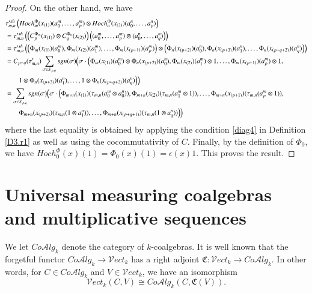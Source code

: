 \documentclass[10pt, colorlinks]{article}
\numberwithin{equation}{section} \DeclareMathSizes{2}{10}{12}{13}
\begin{document}
\begin{proof}
       
      On the other hand, we have
       \begin{align*}
&\tau'^{sh}_{m,n}\left(Hoch_m^\Phi(x_{(1)})(a_0^m,\ldots, a_p^m)\otimes Hoch_n^\Phi(x_{(2)})(a_0^n,\ldots, a_p^n)\right)\\
           &=\tau'^{sh}_{m,n}\left(\left(C^{\Phi_{m}}_{p}(x_{(1)})\otimes C^{\Phi_{n}}_{q}(x_{(2)})\right)\left((a_0^m,\ldots, a_p^m)\otimes (a^n_0,\ldots, a_q^n)\right)\right)\\
           &=\tau'^{sh}_{m,n}\left(\left(\Phi_{m}(x_{(1)})(a_0^m),\Phi_{m}(x_{(2)})(a^m_1),\ldots, \Phi_{m}(x_{(p+1)})(a^m_p)\right)\otimes \left(\Phi_{n}(x_{(p+2)})(a^n_0), \Phi_{n}(x_{(p+3)})(a_1^n),\ldots,\Phi_{n}(x_{(p+q+2)})(a^n_q)\right)\right)\\
           &=C_{p+q}(\tau'_{m,n})\sum_{\sigma\in S_{p,q}}sgn(\sigma)\Big(\sigma\cdot \Big(\Phi_{m}(x_{(1)})(a_0^m)\otimes \Phi_{n}(x_{(p+2)})(a^n_0),\Phi_{m}(x_{(2)})(a_1^m)\otimes 1,\ldots, \Phi_{m}(x_{(p+1)})(a_p^m)\otimes 1,\\
           &\qquad 1\otimes \Phi_{n}(x_{(p+3)})(a_1^n),\ldots,1\otimes\Phi_{n}(x_{(p+q+2)})(a^n_q)\Big)\Big)\notag\\
           &=\sum_{\sigma\in S_{p,q}}sgn(\sigma)\Big(\sigma\cdot\Big(\Phi_{m+n}(x_{(1)})(\tau_{m,n}(a_0^m\otimes a_0^n)),\Phi_{m+n}(x_{(2)})(\tau_{m,n}(a_1^m\otimes1)),\ldots,\Phi_{m+n}(x_{(p+1)})(\tau_{m,n}(a_p^m\otimes 1)),\\
          &\qquad\Phi_{m+n}(x_{(p+2)})(\tau_{m,n}(1\otimes a_1^n)),\ldots ,\Phi_{m+n}(x_{(p+q+1)})(\tau_{m,n}(1\otimes a_q^n))\Big)\Big)\notag
       \end{align*}
       where the last equality is obtained by applying the condition \eqref{diag4} in Definition \ref{D3.r1} as well as using the cocommutativity of $C$.   Finally, by the definition of $\Phi_0$, we have $Hoch^\Phi_{0}(x)(1)=\Phi_0(x)(1)=\epsilon(x)1$. This proves the result.
      \end{proof}


	\section{Universal measuring coalgebras and  multiplicative sequences}
    We let $Co\mathcal Alg_k$ denote the category of $k$-coalgebras. It is well known that the forgetful functor $Co\mathcal Alg_k\longrightarrow \mathcal Vect_k$ has a right adjoint $\mathfrak C: \mathcal Vect_k\longrightarrow Co\mathcal Alg_k$. In other words, for $C\in  Co\mathcal Alg_k$ and $V\in \mathcal Vect_k$, we have an isomorphism
    \begin{equation}\label{eq4.1p}
             \mathcal Vect_k(C, V)\cong Co\mathcal Alg_k(C,\mathfrak C(V)).
    \end{equation}
    
\end{document}
